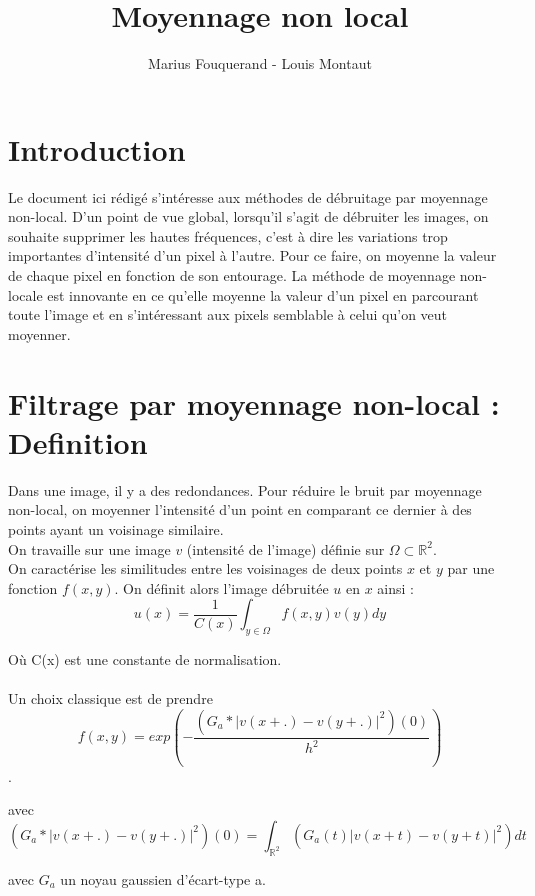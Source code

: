 \documentclass{article}
\title{Moyennage non local}
\author{Marius Fouquerand - Louis Montaut }
\date{}
\begin{document}
\maketitle

\section{Introduction}
Le document ici rédigé s'intéresse aux méthodes de débruitage par moyennage non-local. D'un point de vue global, lorsqu'il s'agit de débruiter les images, on souhaite supprimer les hautes fréquences, c'est à dire les variations trop importantes d'intensité d'un pixel à l'autre. Pour ce faire, on moyenne la valeur de chaque pixel en fonction de son entourage. La méthode de moyennage non-locale est innovante en ce qu'elle moyenne la valeur d'un pixel en parcourant toute l'image et en s'intéressant aux pixels semblable à celui qu'on veut moyenner.

\section{Filtrage par moyennage non-local : Definition} 

Dans une image, il y a des redondances. Pour réduire le bruit par moyennage non-local, on moyenner l'intensité  d'un point en comparant ce dernier à des points ayant un voisinage similaire. \\
On travaille sur une image $v$ (intensité de l'image) définie sur $\Omega \subset \mathbb{R}^2$. \\
On caractérise les similitudes entre les voisinages de deux points $x$ et $y$ par une fonction $f(x,y)$. On définit alors l'image débruitée $u$ en $x$ ainsi : $$u(x) = \frac{1}{C(x)} \int_{y \in \Omega}f(x,y) v(y) dy  $$ 

Où C(x) est une constante de normalisation.\\
\\
Un choix classique est de prendre $$f(x,y) = exp(- \frac{(G_a * |v(x+.)-v(y + .)|^2)(0)}{h^2}) $$. 

avec $$ (G_a * |v(x+.)-v(y + .)|^2)(0) = \int_{\mathbb{R}^2} (G_a(t) |v(x+t)-v(y+t)|^2) dt  $$ 

avec $G_a$ un noyau gaussien d'écart-type a. 
\end{document}
